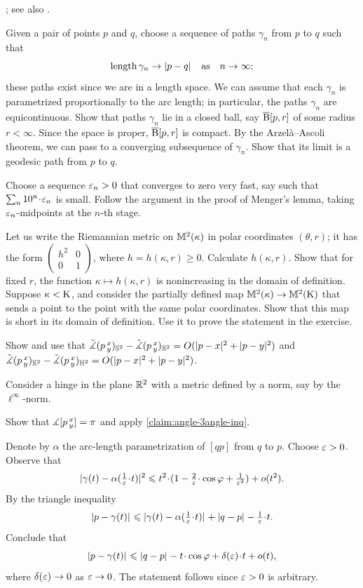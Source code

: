  \cite[Corollary]{hu-kirk}; see also \cite[Lemma 2.3]{petrunin-stadler}.

Given a pair of points $p$ and $q$, choose a sequence of paths $\gamma_n$ from $p$ to $q$ such that
\[\length\gamma_n\to \dist pq{}
\quad\text{as}\quad
n\to\infty;\]
these paths exist since we are in a length space.
We can assume that each $\gamma_n$ is parametrized proportionally to the arc length;
in particular, the paths $\gamma_n$ are equicontinuous.
Show that paths $\gamma_n$ lie in a closed ball, say $\overline{\mathrm{B}}{}[p,r]$ of some radius $r<\infty$.
Since the space is proper, $\overline{\mathrm{B}}{}[p,r]$ is compact.
By the Arzelà--Ascoli theorem, we can pass to a converging subsequence of $\gamma_n$.
Show that its limit is a geodesic path from $p$ to $q$.

Choose a sequence $\varepsilon_n>0$ that converges to zero very fast, say such that $\sum_n10^n\cdot \eps_n$ is small.
Follow the argument in the proof of Menger's lemma, taking $\varepsilon_n$-midpoints at the $n$-th stage.

Let us write the Riemannian metric on $\mathbb{M}^2(\kappa)$ in polar coordinates $(\theta,r)$;
it has the form 
$(\begin{smallmatrix}
h^2&0
\\
0&1
\end{smallmatrix})$, where $h=h(\kappa,r)\ge 0$.
Calculate $h(\kappa,r)$.
Show that for fixed $r$, the function $\kappa\mapsto h(\kappa,r)$ is nonincreasing in the domain of definition.
Suppose $\kappa<\mathrm{K}$, and consider the partially defined map $\mathbb{M}^2(\kappa)\to\mathbb{M}^2(\mathrm{K})$ that sends a point to the point with the same polar coordinates.
Show that this map is short in its domain of definition.
Use it to prove the statement in the exercise.


 Show and use that 
$\angk p{x}{y}_{\SSS^2}-\angk p{x}{y}_{\EE^2}=O(\dist[2]{p}{x}{}+\dist[2]{p}{y}{})$
and 
$\angk p{x}{y}_{\EE^2}-\angk p{x}{y}_{\HH^2}=O(\dist[2]{p}{x}{}+\dist[2]{p}{y}{})$.

Consider a hinge in the plane $\mathbb{R}^2$ with a metric defined by a norm, say by the $\ell^\infty$-norm.

Show that $\measuredangle[p\,{}^{x}_{y}]=\pi$ and apply \ref{claim:angle-3angle-inq}.

Denote by $\alpha$ the arc-length parametrization of $[qp]$ from $q$ to $p$.
Choose $\varepsilon>0$.
Observe that 
\[\dist[2]{\gamma(t)}{\alpha(\tfrac1\eps\cdot t)}{}\le t^2\cdot(1-\tfrac2\eps\cdot\cos\phi+\tfrac1{\eps^2})+o(t^2).\]
By the triangle inequality
\[\dist{p}{\gamma(t)}{}\le \dist{\gamma(t)}{\alpha(\tfrac1\eps\cdot t)}{}+\dist{q}{p}{}-\tfrac1\eps\cdot t.\]
Conclude that
\[\dist{p}{\gamma(t)}{}
\le\dist{q}{p}{}-t\cdot \cos \phi+\delta(\eps)\cdot t+o(t),\]
where $\delta(\varepsilon)\to 0$ as $\varepsilon\to0$.
The statement follows since $\varepsilon>0$ is arbitrary.


